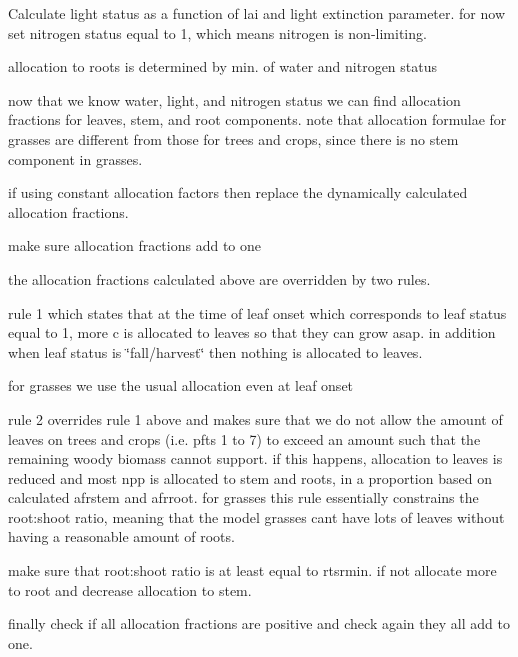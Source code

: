 Calculate light status as a function of lai and light extinction parameter. for now set nitrogen status equal to 1, which means nitrogen is non-\/limiting.

allocation to roots is determined by min. of water and nitrogen status

now that we know water, light, and nitrogen status we can find allocation fractions for leaves, stem, and root components. note that allocation formulae for grasses are different from those for trees and crops, since there is no stem component in grasses.

if using constant allocation factors then replace the dynamically calculated allocation fractions.

make sure allocation fractions add to one

the allocation fractions calculated above are overridden by two rules.

rule 1 which states that at the time of leaf onset which corresponds to leaf status equal to 1, more c is allocated to leaves so that they can grow asap. in addition when leaf status is \char`\"{}fall/harvest\char`\"{} then nothing is allocated to leaves.

for grasses we use the usual allocation even at leaf onset

rule 2 overrides rule 1 above and makes sure that we do not allow the amount of leaves on trees and crops (i.\+e. pfts 1 to 7) to exceed an amount such that the remaining woody biomass cannot support. if this happens, allocation to leaves is reduced and most npp is allocated to stem and roots, in a proportion based on calculated afrstem and afrroot. for grasses this rule essentially constrains the root\+:shoot ratio, meaning that the model grasses can\textquotesingle{}t have lots of leaves without having a reasonable amount of roots.

make sure that root\+:shoot ratio is at least equal to rtsrmin. if not allocate more to root and decrease allocation to stem.

finally check if all allocation fractions are positive and check again they all add to one.